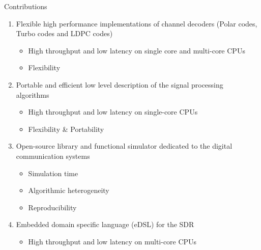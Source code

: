 \begin{frame}{Contributions}
  \begin{enumerate}
    \item<1-> Flexible high performance implementations of channel decoders (Polar codes, Turbo codes and LDPC codes)~\cite{Cassagne2015c,Cassagne2016a,Cassagne2016b,Leonardon2019,Ghaffari2019}
    \begin{itemize}
      \item High throughput and low latency on single core and multi-core CPUs
      \item Flexibility
    \end{itemize}
    \vspace{.3em}
    \item<2-> Portable and efficient low level description of the signal processing algorithms~\cite{Cassagne2018}
    \begin{itemize}
      \item High throughput and low latency on single-core CPUs
      \item Flexibility \& Portability
    \end{itemize}
    \vspace{.3em}
    \item<3-> Open-source library and functional simulator dedicated to the digital communication systems~\cite{Cassagne2017,Cassagne2017a,Cassagne2019a}
    \begin{itemize}
      \item Simulation time
      \item Algorithmic heterogeneity
      \item Reproducibility
    \end{itemize}
    \vspace{.3em}
    \item<4-> Embedded domain specific language (eDSL) for the SDR
    \begin{itemize}
      \item High throughput and low latency on multi-core CPUs
    \end{itemize}
  \end{enumerate}
\end{frame}
